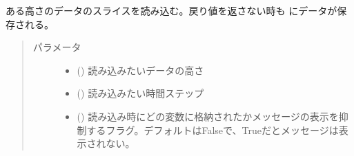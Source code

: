 \documentclass[letterpaper,10pt,dvipdfmx,report]{sphinxmanual}
\begin{document}
\begin{fulllineitems}
\label{\detokenize{io:R2D2.R2D2_data.read_qq_select}}
ある高さのデータのスライスを読み込む。戻り値を返さない時も {\hyperref[\detokenize{io:R2D2.R2D2_data.qs}]{}} にデータが保存される。
\begin{quote}\begin{description}
\item[{パラメータ}] \leavevmode\begin{itemize}
\item {} 
 () \sphinxhyphen{}\sphinxhyphen{} 読み込みたいデータの高さ

\item {} 
 () \sphinxhyphen{}\sphinxhyphen{} 読み込みたい時間ステップ

\item {} 
 () \sphinxhyphen{}\sphinxhyphen{} 読み込み時にどの変数に格納されたかメッセージの表示を抑制するフラグ。デフォルトはFalseで、Trueだとメッセージは表示されない。

\end{itemize}

\end{description}\end{quote}

\end{fulllineitems}

\end{document}
